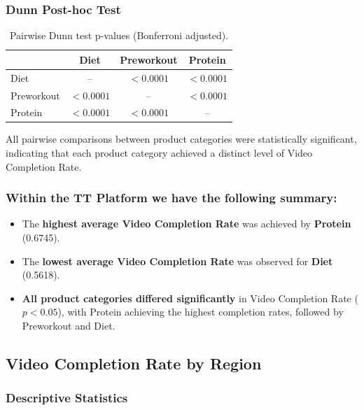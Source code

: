 \vspace{0.3cm}

\subsubsection{Dunn Post-hoc Test}

\begin{table}[H]
	\centering
	\caption{Pairwise Dunn test p-values (Bonferroni adjusted).}
	\begin{tabular}{lccc}
		\toprule
		& Diet & Preworkout & Protein \\
		\midrule
		Diet & -- & $<0.0001$ & $<0.0001$ \\
		Preworkout & $<0.0001$ & -- & $<0.0001$ \\
		Protein & $<0.0001$ & $<0.0001$ & -- \\
		\bottomrule
	\end{tabular}
\end{table}

All pairwise comparisons between product categories were statistically significant, indicating that each product category achieved a distinct level of Video Completion Rate.

\subsubsection{Within the TT Platform we have the following summary:}

\begin{itemize}
	\item The \textbf{highest average Video Completion Rate} was achieved by \textbf{Protein} (0.6745).
	\item The \textbf{lowest average Video Completion Rate} was observed for \textbf{Diet} (0.5618).
	\item \textbf{All product categories differed significantly} in Video Completion Rate ($p<0.05$), with Protein achieving the highest completion rates, followed by Preworkout and Diet.
\end{itemize}

\subsection{Video Completion Rate by Region}
\label{appendix:video_completion_rate_region_analysis_VCR}

\subsubsection{Descriptive Statistics}

